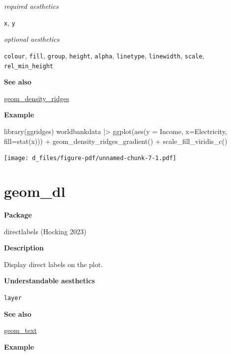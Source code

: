 \documentclass[
  letterpaper,
  DIV=11,
  numbers=noendperiod]{scrreprt}
\newenvironment{Shaded}{\begin{snugshade}}{\end{snugshade}}
\newcommand{\AttributeTok}[1]{\textcolor[rgb]{0.40,0.45,0.13}{#1}}
\newcommand{\FunctionTok}[1]{\textcolor[rgb]{0.28,0.35,0.67}{#1}}
\newcommand{\NormalTok}[1]{\textcolor[rgb]{0.00,0.23,0.31}{#1}}
\newcommand{\SpecialCharTok}[1]{\textcolor[rgb]{0.37,0.37,0.37}{#1}}
\begin{document}
\emph{required aesthetics}

\texttt{x}, \texttt{y}

\emph{optional aesthetics}

\texttt{colour}, \texttt{fill}, \texttt{group}, \texttt{height},
\texttt{alpha}, \texttt{linetype}, \texttt{linewidth}, \texttt{scale},
\texttt{rel\_min\_height}

\textbf{See also}

\hyperref[density_ridges]{geom\_density\_ridges}

\textbf{Example}

\begin{Shaded}
\begin{Highlighting}[]
\FunctionTok{library}\NormalTok{(ggridges)}
\NormalTok{ worldbankdata }\SpecialCharTok{|\textgreater{}}
  \FunctionTok{ggplot}\NormalTok{(}\FunctionTok{aes}\NormalTok{(}\AttributeTok{y =}\NormalTok{ Income, }\AttributeTok{x=}\NormalTok{Electricity, }\AttributeTok{fill=}\FunctionTok{stat}\NormalTok{(x))) }\SpecialCharTok{+}   
  \FunctionTok{geom\_density\_ridges\_gradient}\NormalTok{() }\SpecialCharTok{+}
  \FunctionTok{scale\_fill\_viridis\_c}\NormalTok{()}
\end{Highlighting}
\end{Shaded}

\texttt{[image: d\_files/figure-pdf/unnamed-chunk-7-1.pdf]}

\section{geom\_dl}\label{dl}

\textbf{Package}

directlabels (Hocking 2023)

\textbf{Description}

Display direct labels on the plot.

\textbf{Understandable aesthetics}

\texttt{layer}

\textbf{See also}

\hyperref[text]{geom\_text}

\textbf{Example}
\end{document}
